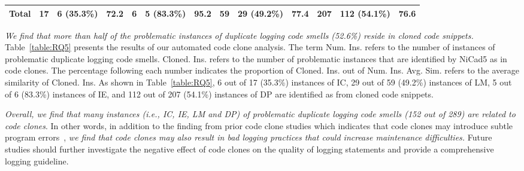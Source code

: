 \begin{table*}
{\begin{tabular}{c|rrr|rrr|rrr|rrr}
        \midrule

        \textbf{Total}         & 17 &6 (35.3\%) & 72.2     & 6 & 5 (83.3\%) &95.2     & 59 &29 (49.2\%) &77.4     &207 & 112 (54.1\%) &76.6\\


        \bottomrule
    \end{tabular}
    }
    \vspace{-0.3cm}

    \label{table:RQ5}
\end{table*}

{\em We find that more than half of the problematic instances of duplicate logging code smells (52.6\%) reside in cloned code snippets.}
Table~\ref{table:RQ5} presents the results of our automated code clone analysis. The term {\sf Num. Ins.} refers to the number of instances of problematic duplicate logging code smells. {\sf Cloned. Ins.} refers to the number of problematic instances that are identified by NiCad5 as in code clones. The percentage following each number indicates the proportion of {\sf Cloned. Ins.} out of {\sf Num. Ins}. {\sf Avg. Sim.} refers to the average similarity of {\sf Cloned. Ins}. As shown in Table~\ref{table:RQ5}, 6 out of 17 (35.3\%) instances of IC, 29 out of 59 (49.2\%) instances of LM, 5 out of 6 (83.3\%) instances of IE, and 112 out of 207 (54.1\%) instances of DP are identified as from cloned code snippets.

{\em Overall, we find that many instances (i.e., IC, IE, LM and DP) of problematic duplicate logging code smells (152 out of 289) are related to code clones}. In other words, in addition to the finding from prior code clone studies which indicates that code clones may introduce subtle program errors~\cite{contextCloneBugs, tracyhallcodesmell}, {\em we find that code clones may also result in bad logging practices that could increase maintenance difficulties.} Future studies should further investigate the negative effect of code clones on the quality of logging statements and provide a comprehensive logging guideline.


